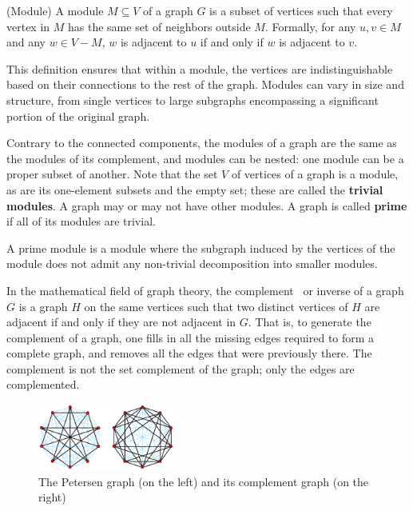 \begin{mydef}
(Module)
    A module $M \subseteq V$ of a graph $G$ is a subset of vertices such that every vertex in $M$ has the same set of neighbors outside $M$.
    Formally, for any $u, v \in M$ and any $w \in V - M$, $w$ is adjacent to $u$ if and only if $w$ is adjacent to $v$.
\end{mydef}

This definition ensures that within a module, the vertices are indistinguishable based on their connections to the rest of the graph.
Modules can vary in size and structure, from single vertices to large subgraphs encompassing a significant portion of the original graph.

Contrary to the connected components, the modules of a graph are the same as the modules of its complement, and modules can be nested: one module can be a proper subset of another.
Note that the set $V$ of vertices of a graph is a module, as are its one-element subsets and the empty set; these are called the \textbf{trivial modules}.
A graph may or may not have other modules.
A graph is called \textbf{prime} if all of its modules are trivial.

\begin{mydef}
    A prime module is a module where the subgraph induced by the vertices of the module does not admit any non-trivial decomposition into smaller modules.
\end{mydef}

In the mathematical field of graph theory, the complement~\cite{complementgraphwikipedia} or inverse of a graph $G$ is a graph $H$ on the same vertices such that two distinct vertices of $H$ are adjacent if and only if they are not adjacent in $G$.
That is, to generate the complement of a graph, one fills in all the missing edges required to form a complete graph, and removes all the edges that were previously there.
The complement is not the set complement of the graph; only the edges are complemented.

\begin{figure}[!h]
    \centering
    \includegraphics[width=0.40\textwidth]{images/graphs/Petersen_graph_complement}
    \caption{The Petersen graph (on the left) and its complement graph (on the right) \cite{complementgraphwikipedia}}
    \label{fig:the}
\end{figure}


